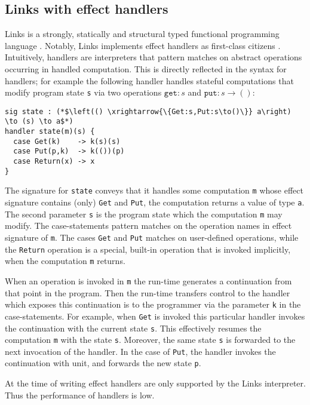 \documentclass[preprint,10pt,numbers]{sigplanconf}
\begin{document}
  \subsection{Links with effect handlers}
  Links is a strongly, statically and structural typed functional programming language \cite{Cooper2006}. Notably, Links implements effect handlers as first-class citizens \cite{Hillerstrom2015}. Intuitively, handlers are interpreters that pattern matches on abstract operations occurring in handled computation. This is directly reflected in the syntax for handlers; for example the following handler handles stateful computations that modify program state \texttt{s} via two operations $\texttt{get} : s$ and $\texttt{put} : s \to ()$:
\begin{lstlisting}[style=links,caption={}]
sig state : (*$\left(() \xrightarrow{\{Get:s,Put:s\to()\}} a\right) \to (s) \to a$*)
handler state(m)(s) {
  case Get(k)    -> k(s)(s)
  case Put(p,k)  -> k(())(p)
  case Return(x) -> x
}
\end{lstlisting}
The signature for \texttt{state} conveys that it handles some computation \texttt{m} whose effect signature contains (only) \texttt{Get} and \texttt{Put}, the computation returns a value of type \texttt{a}. The second parameter \texttt{s} is the program state which the computation \texttt{m} may modify.
The case-statements pattern matches on the operation names in effect signature of \texttt{m}.
The cases \texttt{Get} and \texttt{Put} matches on user-defined operations, while the \texttt{Return} operation is a special, built-in operation that is invoked implicitly, when the computation \texttt{m} returns.

When an operation is invoked in \texttt{m} the run-time generates a continuation from that point in the program. Then the run-time transfers control to the handler which exposes this continuation is to the programmer via the parameter \texttt{k} in the case-statements. For example, when \texttt{Get} is invoked this particular handler invokes the continuation with the current state \texttt{s}. This effectively resumes the computation \texttt{m} with the state \texttt{s}. Moreover, the same state \texttt{s} is forwarded to the next invocation of the handler. In the case of \texttt{Put}, the handler invokes the continuation with unit, and forwards the new state \texttt{p}.


At the time of writing effect handlers are only supported by the Links interpreter. Thus the performance of handlers is low.
\end{document}

